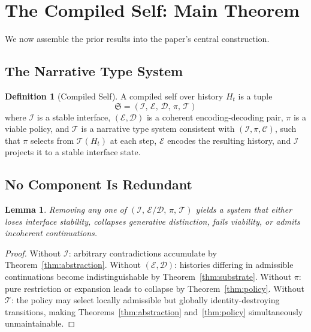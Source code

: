 \documentclass[12pt, a4paper]{article}
\theoremstyle{plain}
\newtheorem{lemma}[theorem]{Lemma}
\theoremstyle{definition}
\newtheorem{definition}[theorem]{Definition}
\theoremstyle{remark}
\begin{document}
\section{The Compiled Self: Main Theorem}

We now assemble the prior results into the paper's central construction.

\subsection{The Narrative Type System}

\begin{definition}[Compiled Self]
A compiled self over history $H_t$ is a tuple
\[
\mathfrak{S} = (\mathcal{I},\, \mathcal{E},\, \mathcal{D},\, \pi,\, \mathcal{T})
\]
where $\mathcal{I}$ is a stable interface, $(\mathcal{E}, \mathcal{D})$ is a coherent encoding-decoding pair, $\pi$ is a viable policy, and $\mathcal{T}$ is a narrative type system consistent with $(\mathcal{I}, \pi, \mathcal{C})$, such that $\pi$ selects from $\mathcal{T}(H_t)$ at each step, $\mathcal{E}$ encodes the resulting history, and $\mathcal{I}$ projects it to a stable interface state.
\end{definition}

\subsection{No Component Is Redundant}

\begin{lemma}
Removing any one of $(\mathcal{I},\, \mathcal{E}/\mathcal{D},\, \pi,\, \mathcal{T})$ yields a system that either loses interface stability, collapses generative distinction, fails viability, or admits incoherent continuations.
\end{lemma}

\begin{proof}
Without $\mathcal{I}$: arbitrary contradictions accumulate by Theorem~\ref{thm:abstraction}. Without $(\mathcal{E},\mathcal{D})$: histories differing in admissible continuations become indistinguishable by Theorem~\ref{thm:substrate}. Without $\pi$: pure restriction or expansion leads to collapse by Theorem~\ref{thm:policy}. Without $\mathcal{T}$: the policy may select locally admissible but globally identity-destroying transitions, making Theorems~\ref{thm:abstraction} and~\ref{thm:policy} simultaneously unmaintainable.
\end{proof}
\end{document}
